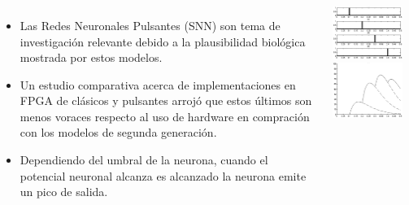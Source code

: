 \frame
{
\frametitle{}
\begin{columns}
\begin{itemize}    
\item Las Redes Neuronales Pulsantes (SNN) son tema de investigación relevante debido a la plausibilidad biológica mostrada por estos modelos. 
\item Un estudio comparativa acerca de implementaciones en FPGA de clásicos y pulsantes arrojó que estos últimos son menos voraces respecto al uso de hardware en compración con los modelos de segunda generación.
\item Dependiendo del umbral de la neurona, cuando el potencial neuronal alcanza es alcanzado la neurona emite un pico de salida. 
\end{itemize}    
    \includegraphics[width=0.9\textwidth]{Figs/2009_BackPropagationFF05}\\
    \includegraphics[width=0.9\textwidth]{Figs/2009_BackPropagationFF06}
\end{columns}
}

